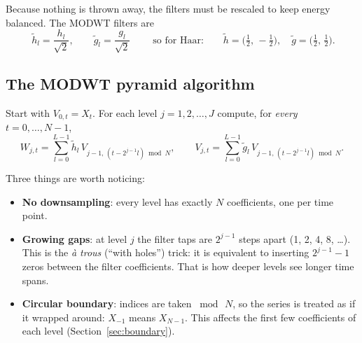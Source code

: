\documentclass[11pt,a4paper]{article}
\newcommand{\hwav}{\tilde{h}}
\newcommand{\gsc}{\tilde{g}}
\begin{document}
Because nothing is thrown away, the filters must be rescaled to keep energy balanced. The MODWT
filters are
\[
  \boxed{\;\hwav_l = \frac{h_l}{\sqrt2},\qquad \gsc_l = \frac{g_l}{\sqrt2}\;}
  \qquad\text{so for Haar:}\qquad
  \hwav = \big(\tfrac12,\,-\tfrac12\big),\quad \gsc = \big(\tfrac12,\,\tfrac12\big).
\]

\subsection{The MODWT pyramid algorithm}

Start with $V_{0,t}=X_t$. For each level $j=1,2,\dots,J$ compute, for \emph{every} $t=0,\dots,N-1$,
\begin{equation}
  \boxed{
  W_{j,t} = \sum_{l=0}^{L-1}\hwav_l\,V_{j-1,\,(t-2^{j-1}l)\bmod N},
  \qquad
  V_{j,t} = \sum_{l=0}^{L-1}\gsc_l\,V_{j-1,\,(t-2^{j-1}l)\bmod N}.}
  \label{eq:pyramid}
\end{equation}

Three things are worth noticing:
\begin{itemize}[leftmargin=1.5em]
  \item \textbf{No downsampling}: every level has exactly $N$ coefficients, one per time point.
  \item \textbf{Growing gaps}: at level $j$ the filter taps are $2^{j-1}$ steps apart (1, 2, 4, 8, \dots). This is the
        \emph{\`a trous} (``with holes'') trick: it is equivalent to inserting $2^{j-1}-1$ zeros between the filter
        coefficients. That is how deeper levels see longer time spans.
  \item \textbf{Circular boundary}: indices are taken $\bmod\,N$, so the series is treated as if it wrapped around:
        $X_{-1}$ means $X_{N-1}$. This affects the first few coefficients of each level (Section~\ref{sec:boundary}).
\end{itemize}
\end{document}
